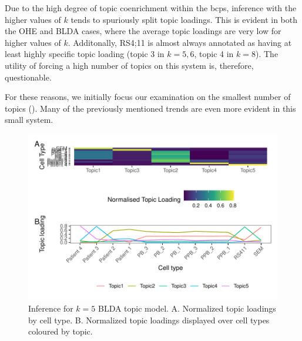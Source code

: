 Due to the high degree of topic coenrichment within the \glspl{bcp}, inference with the higher values of $k$ tends to spuriously split topic loadings. This is evident in both the OHE and BLDA cases, where the average topic loadings are very low for higher values of $k$. Additonally, RS4;11 is almost always annotated as having at least highly specific topic loading (topic 3 in $k=5, 6$, topic 4 in $k=8$). The utility of forcing a high number of topics on this system is, therefore, questionable.

For these reasons, we initially focus our examination on the smallest number of topics (). Many of the previously mentioned trends are even more evident in this small system.

\begin{figure}
    \centering
    \includegraphics[width=\textwidth]{plot/ch5/mll_k_5.pdf}
    \caption{Inference for $k=5$ BLDA topic model. A. Normalized topic loadings by cell type. B. Normalized topic loadings displayed over cell types coloured by topic. }
    \label{fig:mll_k_5}
\end{figure}